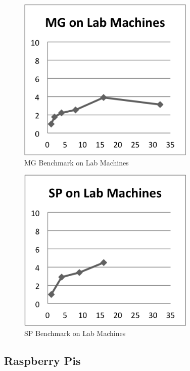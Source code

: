 \documentclass{acm_proc_article-sp}
\begin{document}
\begin{figure}[tbp]
  \centering
  \caption{MG Benchmark on Lab Machines}
	\label{LabMG}
  \includegraphics[width=20pc]{Pics-Lab/MG.png}
\end{figure}

\begin{figure}[tbp]
  \centering
  \caption{SP Benchmark on Lab Machines}
	\label{LabSP}
  \includegraphics[width=20pc]{Pics-Lab/SP.png}
\end{figure}

\clearpage

\subsection{Raspberry Pis}
\end{document}
